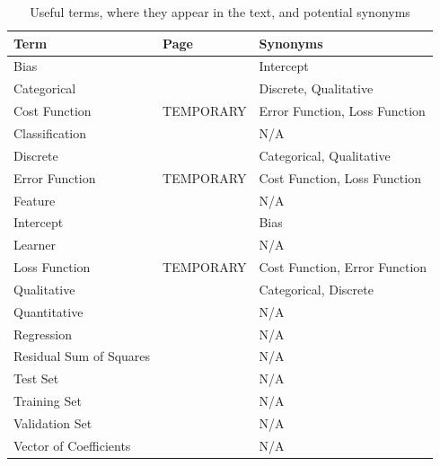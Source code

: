 \documentclass[a4paper,10pt,english]{book}
\begin{document}
\begin{table}[H]
\caption{Useful terms, where they appear in the text, and potential synonyms\label{table_2}}
\centering
\begin{tabular}{| l l l |}
\hline
\textbf{Term} & \textbf{Page} & \textbf{Synonyms} \\
\hline
Bias & \pageref{vocab:bias0} & Intercept \\
Categorical & \pageref{vocab:categorical0} & Discrete, Qualitative \\
Cost Function & TEMPORARY & Error Function, Loss Function \\
Classification & \pageref{vocab:classification0} & N/A \\
Discrete & \pageref{vocab:categorical0} & Categorical, Qualitative \\
Error Function & TEMPORARY & Cost Function, Loss Function \\
Feature & \pageref{vocab:feature0} & N/A \\
Intercept & \pageref{vocab:intercept0} & Bias \\
Learner & \pageref{vocab:learner0} & N/A \\
Loss Function & TEMPORARY & Cost Function, Error Function \\
Qualitative & \pageref{vocab:categorical0} & Categorical, Discrete \\
Quantitative & \pageref{vocab:quantitative0} & N/A \\
Regression & \pageref{vocab:regression0} & N/A \\
Residual Sum of Squares & \pageref{vocab:RSS0} & N/A \\
Test Set & \pageref{vocab:testset0} & N/A \\
Training Set & \pageref{vocab:trainingset0} & N/A \\
Validation Set & \pageref{vocab:validationset0} & N/A \\
Vector of Coefficients & \pageref{vocab:vectorofcoefficients0} & N/A \\
\hline
\end{tabular}
\end{table}

{}

\end{document}
